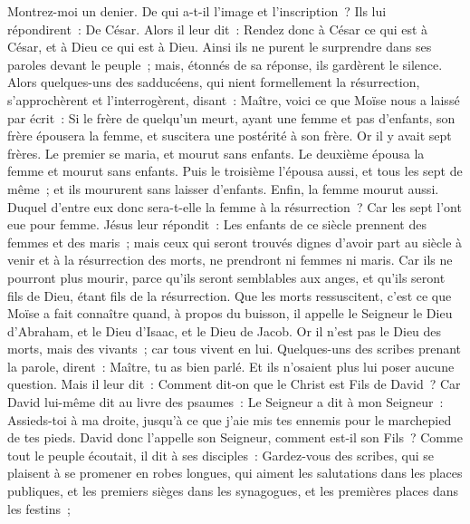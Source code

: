 \begin{multicols}{2}
Montrez-moi un denier. De qui a-t-il l'image et l'inscription~? Ils lui répondirent~: De César.
Alors il leur dit~: Rendez donc à César ce qui est à César, et à Dieu ce qui est à Dieu.
Ainsi ils ne purent le surprendre dans ses paroles devant le peuple~; mais, étonnés de sa réponse, ils gardèrent le silence.
Alors quelques-uns des sadducéens, qui nient formellement la résurrection, s'approchèrent et l'interrogèrent,
disant~: Maître, voici ce que Moïse nous a laissé par écrit~: Si le frère de quelqu'un meurt, ayant une femme et pas d'enfants, son frère épousera la femme, et suscitera une postérité à son frère.
Or il y avait sept frères. Le premier se maria, et mourut sans enfants.
Le deuxième épousa la femme et mourut sans enfants.
Puis le troisième l'épousa aussi, et tous les sept de même~; et ils moururent sans laisser d'enfants.
Enfin, la femme mourut aussi.
Duquel d'entre eux donc sera-t-elle la femme à la résurrection~? Car les sept l'ont eue pour femme.
Jésus leur répondit~: Les enfants de ce siècle prennent des femmes et des maris~;
mais ceux qui seront trouvés dignes d'avoir part au siècle à venir et à la résurrection des morts, ne prendront ni femmes ni maris.
Car ils ne pourront plus mourir, parce qu'ils seront semblables aux anges, et qu'ils seront fils de Dieu, étant fils de la résurrection.
Que les morts ressuscitent, c'est ce que Moïse a fait connaître quand, à propos du buisson, il appelle le Seigneur le Dieu d'Abraham, et le Dieu d'Isaac, et le Dieu de Jacob.
Or il n'est pas le Dieu des morts, mais des vivants~; car tous vivent en lui.
Quelques-uns des scribes prenant la parole, dirent~: Maître, tu as bien parlé.
Et ils n'osaient plus lui poser aucune question.
Mais il leur dit~: Comment dit-on que le Christ est Fils de David~?
Car David lui-même dit au livre des psaumes~: Le Seigneur a dit à mon Seigneur~: Assieds-toi à ma droite,
jusqu'à ce que j'aie mis tes ennemis pour le marchepied de tes pieds.
David donc l'appelle son Seigneur, comment est-il son Fils~?
Comme tout le peuple écoutait, il dit à ses disciples~:
Gardez-vous des scribes, qui se plaisent à se promener en robes longues, qui aiment les salutations dans les places publiques, et les premiers sièges dans les synagogues, et les premières places dans les festins~;

\end{multicols}
